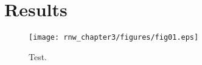{%


\section{Results}


\begin{figure}
\texttt{[image: rnw\_chapter3/figures/fig01.eps]} 
\caption{Test.}%
%
\label{fig:jja4}
\end{figure}

}
